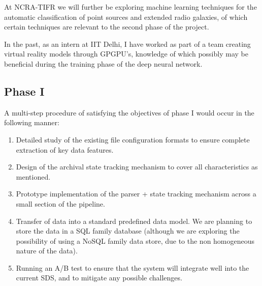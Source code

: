 \documentclass{article}
\begin{document}
\begin{multicols*}{2}
At NCRA-TIFR we will further be exploring machine learning techniques for the automatic classification of point sources and extended radio galaxies, of which certain techniques are relevant to the second phase of the project.

In the past, as an intern at IIT Delhi, I have worked as part of a team creating virtual reality models through GPGPU's, knowledge of which possibly may be beneficial during the training phase of the deep neural network.
\subsection{Phase I}
A multi-step procedure of satisfying the objectives of phase I would occur in the following manner:
\begin{enumerate}
\itemsep0em
\item Detailed study of the existing file configuration formats to ensure complete extraction of key data features.
\item Design of the archival state tracking mechanism to cover all characteristics as mentioned.
\item Prototype implementation of the parser + state tracking mechanism across a small section of the pipeline.
\item Transfer of data into a standard predefined data model. We are planning to store the data in a SQL family database (although we are exploring the possibility of using a NoSQL family data store, due to the non homogeneous nature of the data).
\item Running an A/B test to ensure that the system will integrate well into the current SDS, and to mitigate any possible challenges.
\end{enumerate}

\end{multicols*}
\end{document}
